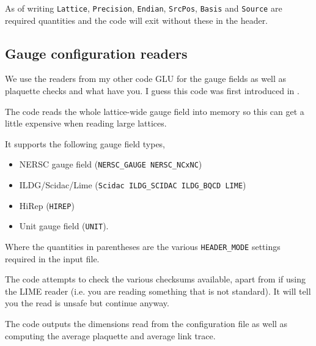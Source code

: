 As of writing \verb|Lattice|, \verb|Precision|, \verb|Endian|, \verb|SrcPos|,
\verb|Basis| and \verb|Source| are required quantities and the code will exit
without these in the header.

\subsection{Gauge configuration readers}

We use the readers from my other code GLU %
for the gauge fields as well as plaquette checks and what have you.
I guess this code was first introduced in \cite{Hudspith:2014oja}.

The code reads the whole lattice-wide gauge field into memory so this
can get a little expensive when reading large lattices.

It supports the following gauge field types,
\begin{itemize}
\item NERSC gauge field (\verb|NERSC_GAUGE NERSC_NCxNC|) %
\item ILDG/Scidac/Lime (\verb|Scidac ILDG_SCIDAC ILDG_BQCD LIME|) %
\item HiRep (\verb|HIREP|) \cite{} %
\item Unit gauge field (\verb|UNIT|).
\end{itemize}

Where the quantities in parentheses are the various \verb|HEADER_MODE| settings
required in the input file.

The code attempts to check the various checksums available, apart from if
using the LIME reader (i.e. you are reading something that is not standard). 
It will tell you the read is unsafe but continue anyway.

The code outputs the dimensions read from the configuration file as well as
computing the average plaquette and average link trace.
